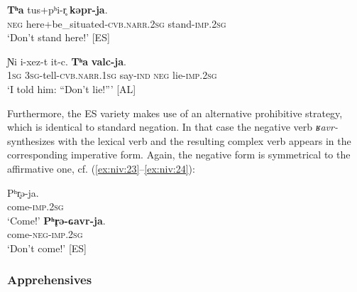 \documentclass[output=paper,colorlinks,citecolor=brown]{langscibook}
\begin{document}
\ea\label{ex:niv:21}
    \gll \textbf{Tʰa} tus+pʰi-r̥ \textbf{kəpr-ja}. \\ 
         \textsc{neg} here+be\_situated-\textsc{cvb.narr.2sg} stand-\textsc{imp.2sg} \\
    \glt ‘Don’t stand here!’ [ES]
\z 

\ea\label{ex:niv:22}
    \gll Ɲi i-xez-t it-c. \textbf{Tʰa} \textbf{valc-ja}. \\ 
         \textsc{1sg} \textsc{3sg}{}-tell-\textsc{cvb.narr.1sg} say-\textsc{ind} \textsc{neg} lie-\textsc{imp.2sg} \\
    \glt ‘I told him: “Don’t lie!”’ \citep{Jushkina2019} [AL]
\z 

Furthermore, the ES variety makes use of an alternative prohibitive strategy, which is identical to standard negation. In that case the negative verb \textit{ʁavr{}-} synthesizes\textbf{ }with the lexical verb and the resulting complex verb appears in the corresponding imperative form. Again, the negative form is symmetrical to the affirmative one, cf. (\ref{ex:niv:23}--\ref{ex:niv:24}):


\ea\label{ex:niv:23}
    \ea\label{ex:niv:23a}
        \gll Pʰr̥ə-ja. \\ 
             come-\textsc{imp.2sg} \\
        \glt ‘Come!’
    \ex\label{ex:niv:23b}
        \gll \textbf{Pʰr̥ə{}-ɢavr-ja}. \\
             come-\textsc{neg-imp.2sg}\\
        \glt  ‘Don’t come!’ [ES]
    \z
\z 


\subsubsection{Apprehensives}\label{sec:niv:2.2.2} 
\end{document}
